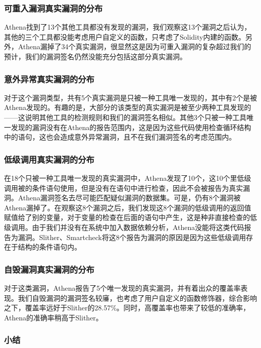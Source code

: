 \subsubsection{可重入漏洞真实漏洞的分布}

Athena找到了13个其他工具都没有发现的漏洞，我们观察这13个漏洞之后认为，其他的三个工具都没能考虑用户自定义的函数，只考虑了Solidity内建的函数。另外，Athena漏掉了34个真实漏洞，很显然这是因为可重入漏洞的复杂超过我们的预计，我们的漏洞签名仍然没能充分包括这部分真实漏洞。

\subsubsection{意外异常真实漏洞的分布}

对于这个漏洞类型，共有5个真实漏洞是只被一种工具唯一发现的，其中有2个是被Athena发现的。有趣的是，大部分的该类型的真实漏洞是被至少两种工具发现的——这说明其他工具的检测规则和我们的漏洞签名相似。其他3个只被一种工具唯一发现的漏洞没有在Athena的报告范围内，这是因为这些代码使用检查循环结构中的语句，这也会造成意外异常漏洞，且不在我们漏洞签名的考虑范围内。

\subsubsection{低级调用真实漏洞的分布}

在18个只被一种工具唯一发现的真实漏洞中，Athena发现了10个，这10个里低级调用被的条件语句使用，但是没有在语句中进行检查，因此不会被报告为真实漏洞。Athena漏洞签名去尽可能匹配疑似漏洞的数据集。可是，仍有8个漏洞被Athena漏掉了。在观察这8个漏洞之后，我们发现这8个漏洞的低级调用的返回值赋值给了别的变量，对于变量的检查在后面的语句中产生，这是种非直接检查的低级调用。由于我们并没有在系统中加入数据依赖分析，Athena没能将这类代码报告为漏洞。Slither、Smartcheck将这8个报告为漏洞的原因是因为这些低级调用存在于结构的条件语句内。

\subsubsection{自毁漏洞真实漏洞的分布}

对于这类漏洞，Athena报告了5个唯一发现的真实漏洞，并有着出众的覆盖率表现。我们自毁漏洞的漏洞签名较㢖，也考虑了用户自定义的函数修饰器，综合影响之下，覆盖率远好于Slither的28.57\%。同时，高覆盖率也带来了较低的准确率，Athena的准确率稍高于Slither。

\subsubsection{小结}

